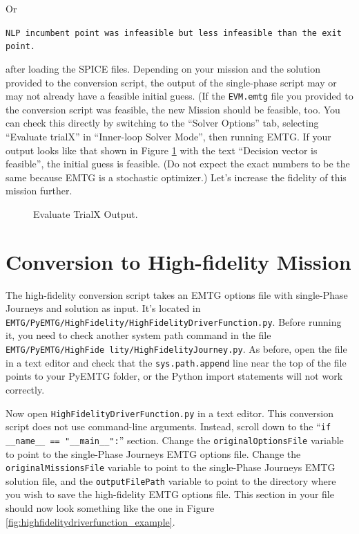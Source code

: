 \documentclass[11pt]{article}
\begin{document}
\noindent Or

\noindent \texttt{NLP incumbent point was infeasible but less infeasible than the exit point.}

\noindent after loading the \acs{SPICE} files. Depending on your mission and the solution provided to the conversion script, the output of the single-phase script may or may not already have a feasible initial guess. (If the \texttt{EVM.emtg} file you provided to the conversion script was feasible, the new Mission should be feasible, too. You can check this directly by switching to the ``Solver Options'' tab, selecting ``Evaluate trialX'' in ``Inner-loop Solver Mode'', then running \ac{EMTG}. If your output looks like that shown in Figure \ref{fig:evaluate_trialx_output} with the text ``Decision vector is feasible'', the initial guess is feasible. (Do not expect the exact numbers to be the same because \ac{EMTG} is a stochastic optimizer.) Let’s increase the fidelity of this mission further.

\begin{figure}[H]
	\centering
	\caption{\label{fig:evaluate_trialx_output}Evaluate TrialX Output.}
\end{figure}

\section{Conversion to High-fidelity Mission}
\label{sec:conversion_to_single_phase_journeys}

The high-fidelity conversion script takes an \ac{EMTG} options file with single-Phase Journeys and solution as input. It’s located in \texttt{EMTG/PyEMTG/HighFidelity/HighFidelityDriverFunction.py}. Before running it, you need to check another system path command in the file \texttt{EMTG/PyEMTG/HighFide lity/HighFidelityJourney.py}. As before, open the file in a text editor and check that the \texttt{sys.path.append} line near the top of the file points to your PyEMTG folder, or the Python import statements will not work correctly.

\noindent Now open \texttt{HighFidelityDriverFunction.py} in a text editor. This conversion script does not use command-line arguments. Instead, scroll down to the ``\texttt{if \_\_name\_\_ == "\_\_main\_\_":}'' section. Change the \texttt{originalOptionsFile} variable to point to the single-Phase Journeys \ac{EMTG} options file. Change the \texttt{originalMissionsFile} variable to point to the single-Phase Journeys \ac{EMTG} solution file, and the \texttt{outputFilePath} variable to point to the directory where you wish to save the high-fidelity \ac{EMTG} options file. This section in your file should now look something like the one in Figure \ref{fig:highfidelitydriverfunction_example}.
\end{document}
